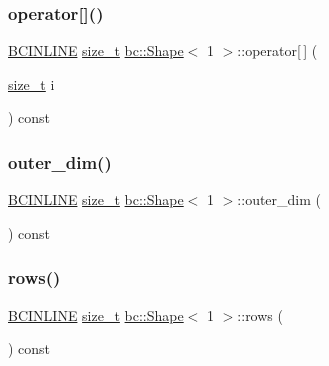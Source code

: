 \mbox{\label{structbc_1_1Shape_3_011_01_4_a3d578987d3b5fd178a2c7014cc9ee21a}} 
\subsubsection{\texorpdfstring{operator[]()}{operator[]()}}
{\footnotesize\ttfamily \hyperlink{common_8h_a6699e8b0449da5c0fafb878e59c1d4b1}{B\+C\+I\+N\+L\+I\+NE} \hyperlink{structbc_1_1Shape_3_011_01_4_a7ab1c3926651c49d726655dbaa5dc0a3}{size\+\_\+t} \hyperlink{structbc_1_1Shape}{bc\+::\+Shape}$<$ 1 $>$\+::operator\mbox{[}$\,$\mbox{]} (\begin{DoxyParamCaption}\item[{\hyperlink{structbc_1_1Shape_3_011_01_4_a7ab1c3926651c49d726655dbaa5dc0a3}{size\+\_\+t}}]{i }\end{DoxyParamCaption}) const\hspace{0.3cm}{\ttfamily [inline]}}

\mbox{\label{structbc_1_1Shape_3_011_01_4_a05bf3322e4ce8607986221200a869c75}} 
\subsubsection{\texorpdfstring{outer\+\_\+dim()}{outer\_dim()}}
{\footnotesize\ttfamily \hyperlink{common_8h_a6699e8b0449da5c0fafb878e59c1d4b1}{B\+C\+I\+N\+L\+I\+NE} \hyperlink{structbc_1_1Shape_3_011_01_4_a7ab1c3926651c49d726655dbaa5dc0a3}{size\+\_\+t} \hyperlink{structbc_1_1Shape}{bc\+::\+Shape}$<$ 1 $>$\+::outer\+\_\+dim (\begin{DoxyParamCaption}{ }\end{DoxyParamCaption}) const\hspace{0.3cm}{\ttfamily [inline]}}

\mbox{\label{structbc_1_1Shape_3_011_01_4_ae840c4aa1854bb3f2fb1dac050626c28}} 
\subsubsection{\texorpdfstring{rows()}{rows()}}
{\footnotesize\ttfamily \hyperlink{common_8h_a6699e8b0449da5c0fafb878e59c1d4b1}{B\+C\+I\+N\+L\+I\+NE} \hyperlink{structbc_1_1Shape_3_011_01_4_a7ab1c3926651c49d726655dbaa5dc0a3}{size\+\_\+t} \hyperlink{structbc_1_1Shape}{bc\+::\+Shape}$<$ 1 $>$\+::rows (\begin{DoxyParamCaption}{ }\end{DoxyParamCaption}) const\hspace{0.3cm}{\ttfamily [inline]}}

